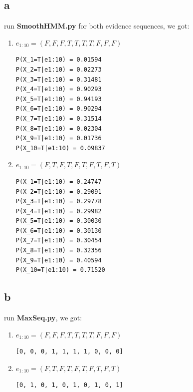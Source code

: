 \documentclass[12pt]{amsart}
\makeatletter
\renewcommand{\section}{\@startsection{section}{1}{0mm}
{-\baselineskip}{0.5\baselineskip}{\bf\leftline}}
\makeatother
\begin{document}
\subsection*{a}
run \textbf{SmoothHMM.py} for both evidence sequences, we got:
\begin{enumerate}
\item $e_{1:10} = (F, F, F, T, T, T, T, F, F, F)$\\
   \begin{verbatim}
P(X_1=T|e1:10) = 0.01594
P(X_2=T|e1:10) = 0.02273
P(X_3=T|e1:10) = 0.31481
P(X_4=T|e1:10) = 0.90293
P(X_5=T|e1:10) = 0.94193
P(X_6=T|e1:10) = 0.90294
P(X_7=T|e1:10) = 0.31514
P(X_8=T|e1:10) = 0.02304
P(X_9=T|e1:10) = 0.01736
P(X_10=T|e1:10) = 0.09837
   \end{verbatim}

\item $e_{1:10} = (F, T, F, T, F, T, F, T, F, T)$\\

   \begin{verbatim}
P(X_1=T|e1:10) = 0.24747
P(X_2=T|e1:10) = 0.29091
P(X_3=T|e1:10) = 0.29778
P(X_4=T|e1:10) = 0.29982
P(X_5=T|e1:10) = 0.30030
P(X_6=T|e1:10) = 0.30130
P(X_7=T|e1:10) = 0.30454
P(X_8=T|e1:10) = 0.32356
P(X_9=T|e1:10) = 0.40594
P(X_10=T|e1:10) = 0.71520
   \end{verbatim}
\end{enumerate}

\subsection*{b}
run \textbf{MaxSeq.py}, we got: 
\begin{enumerate}
\item $e_{1:10} = (F, F, F, T, T, T, T, F, F, F)$\\
   \begin{verbatim}
[0, 0, 0, 1, 1, 1, 1, 0, 0, 0]
   \end{verbatim}

\item $e_{1:10} = (F, T, F, T, F, T, F, T, F, T)$\\

   \begin{verbatim}
[0, 1, 0, 1, 0, 1, 0, 1, 0, 1]
   \end{verbatim}
\end{enumerate}
\end{document}
